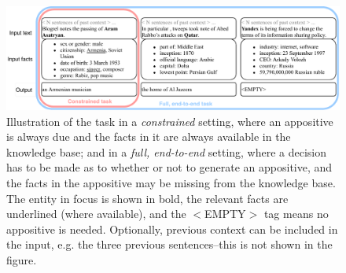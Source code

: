 \documentclass[11pt]{article}
\newcommand{\jttodo}[1]{\todo[color=blue!20]{#1}}
\begin{document}
\begin{figure}
    \centering
    \includegraphics[width=\linewidth]{task.pdf}
    \caption{Illustration of the task in a \textit{constrained} setting, where an appositive is always due and the facts in it are always available in the knowledge base; and in a \textit{full, end-to-end} setting, where a decision has to be made as to whether or not to generate an appositive, and the facts in the appositive may be missing from the knowledge base. The entity in focus is shown in bold, the relevant facts are underlined (where available), and the $<$EMPTY$>$ tag means no appositive is needed. Optionally, previous context can be included in the input, e.g. the three previous sentences--this is not shown in the figure.}
    \label{fig:task}
\end{figure}

\end{document}
